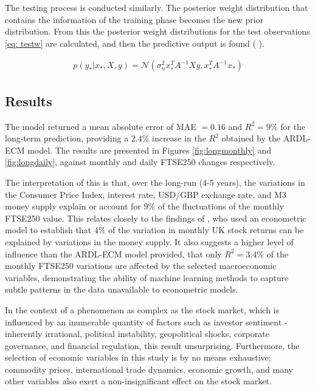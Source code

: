 \documentclass[11pt,a4paper]{article}
\newcommand{\citeboth}[1]{\citeauthor{#1} \citep{#1}}
\begin{document}
The testing process is conducted similarly. The 
posterior weight distribution that contains the information of the training phase becomes the new 
prior distribution. From this the posterior weight distributions for the test observations \eqref{eq: testw}
are calculated, and then the predictive output is found (\citeboth{rasmussen2006}).

\begin{align}
    p(y_{*}|x_{*}, X, y) = \mathcal{N}(\sigma_{n}^{2} x_{*}^{T}A^{-1}Xy, x_{*}^{T}A^{-1}x_{*}) \label{eq: testw}
\end{align}


\subsection{Results}

The model returned a mean absolute error of MAE $=0.16$ and 
$R^2 = 9\%$ for the long-term prediction, providing a 
$2.4\%$ increase in the $R^2$ obtained by the ARDL-ECM model. The results are presented 
in Figures \ref{fig:longmonthly} and \ref{fig:longdaily}, against monthly and daily FTSE250 changes respectively.

The interpretation of this is that, over the long-run (4-5 years), the variations in the 
Consumer Price Index, interest rate, USD/GBP exchange rate, and M3 money 
supply explain or account for $9\%$ of the fluctuations of the
monthly FTSE250 value. This relates closely to the findings of \citeboth{conover1999}, 
who used an econometric model to establish that $4\%$ of the variation in monthly UK stock returns can be 
explained by variations in the money supply. It also suggests a higher level of influence 
than the ARDL-ECM model provided, that only $R^2=3.4\%$ of the monthly FTSE250 variations 
are affected by the selected macroeconomic variables, demonstrating the ability of machine learning
methods to capture subtle patterns in the data unavailable to econometric models. 


In the context of a phenomenon as complex as the stock market,
which is influenced by an inumerable quantity of factors such as investor sentiment
- inherently irrational, 
political instability, geopolitical shocks, corporate governance, and financial regulation, this result 
unsurprising. Furthermore, the selection of economic variables in this study
is by no means exhaustive; commodity prices, international trade dynamics,
economic growth, and many other variables also exert a non-insignificant 
effect on the stock market.
\end{document}
